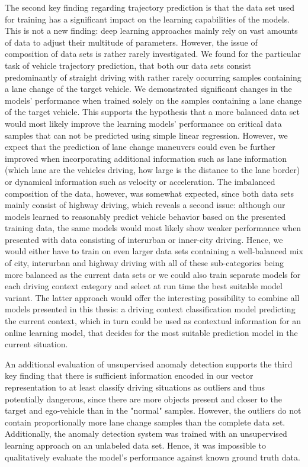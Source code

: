 The second key finding regarding trajectory prediction is that the data set used for training has a significant impact on the learning capabilities of the models.
This is not a new finding: deep learning approaches mainly rely on vast amounts of data to adjust their multitude of parameters.
However, the issue of composition of data sets is rather rarely investigated.
We found for the particular task of vehicle trajectory prediction, that both our data sets consist predominantly of straight driving with rather rarely occurring samples containing a lane change of the target vehicle.
We demonstrated significant changes in the models' performance when trained solely on the samples containing a lane change of the target vehicle.
This supports the hypothesis that a more balanced data set would most likely improve the learning models' performance on critical data samples that can not be predicted using simple linear regression.
However, we expect that the prediction of lane change maneuvers could even be further improved when incorporating additional information such as lane information (which lane are the vehicles driving, how large is the distance to the lane border) or dynamical information such as velocity or acceleration.
The imbalanced composition of the data, however, was somewhat expected, since both data sets mainly consist of highway driving, which reveals a second issue: although our models learned to reasonably predict vehicle behavior based on the presented training data, the same models would most likely show weaker performance when presented with data consisting of interurban or inner-city driving.
Hence, we would either have to train on even larger data sets containing a well-balanced mix of city, interurban and highway driving with all of these sub-categories being more balanced as the current data sets or we could also train separate models for each driving context category and select at run time the best suitable model variant.
The latter approach would offer the interesting possibility to combine all models presented in this thesis: a driving context classification model predicting the current context, which in turn could be used as contextual information for an online learning model, that decides for the most suitable prediction model in the current situation.

An additional evaluation of unsupervised anomaly detection supports the third key finding that there is sufficient information encoded in our vector representation to at least classify driving situations as outliers and thus potentially dangerous, since there are more objects present and closer to the target and ego-vehicle than in the "normal" samples.
However, the outliers do not contain proportionally more lane change samples than the complete data set.
Additionally, the anomaly detection system was trained with an unsupervised learning approach on an unlabeled data set.
Hence, it was impossible to qualitatively evaluate the model's performance against known ground truth data.

